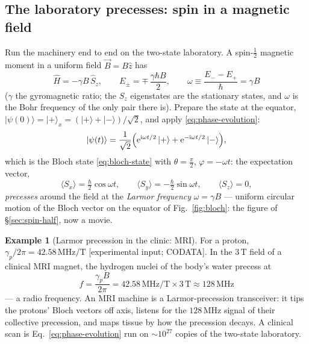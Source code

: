 \documentclass[11pt]{article}
\theoremstyle{plain}
\theoremstyle{definition}
\newtheorem{example}[theorem]{Example}
\theoremstyle{remark}
\newcommand{\ee}{\mathrm{e}}
\newcommand{\ii}{\mathrm{i}}
\newcommand{\op}[1]{\hat{#1}}
\newcommand{\ket}[1]{\lvert #1 \rangle}
\begin{document}
\subsection{The laboratory precesses: spin in a magnetic field}
\label{sec:precession}

Run the machinery end to end on the two-state laboratory. A
spin-$\tfrac12$ magnetic moment in a uniform field $\vec B = B\hat z$
has
\begin{equation}
  \op H = -\gamma B\,\op S_z,
  \qquad
  E_\pm = \mp\,\frac{\gamma\hbar B}{2},
  \qquad
  \omega \equiv \frac{E_- - E_+}{\hbar} = \gamma B
\end{equation}
($\gamma$ the gyromagnetic ratio; the $S_z$ eigenstates are the
stationary states, and $\omega$ is the Bohr frequency of the only
pair there is). Prepare the state at the equator,
$\ket{\psi(0)} = \ket+_x = (\ket+ + \ket-)/\sqrt2$, and apply
\eqref{eq:phase-evolution}:
\begin{equation}
  \ket{\psi(t)}
  = \frac{1}{\sqrt2}\Bigl(
      \ee^{\ii\omega t/2}\,\ket+
      + \ee^{-\ii\omega t/2}\,\ket-
    \Bigr),
\end{equation}
which is the Bloch state \eqref{eq:bloch-state} with
$\theta = \tfrac\pi2$, $\varphi = -\omega t$: the expectation
vector,
\begin{equation}
  \langle S_x\rangle = \tfrac\hbar2\cos\omega t,
  \qquad
  \langle S_y\rangle = -\tfrac\hbar2\sin\omega t,
  \qquad
  \langle S_z\rangle = 0,
\end{equation}
\emph{precesses} around the field at the \emph{Larmor frequency}
$\omega = \gamma B$ --- uniform circular motion of the Bloch vector
on the equator of Fig.~\ref{fig:bloch}: the figure of
\S\ref{sec:spin-half}, now a movie.

\begin{example}[Larmor precession in the clinic: MRI]
\label{ex:mri}
For a proton, $\gamma_p/2\pi = 42.58\,\mathrm{MHz/T}$
[experimental input; CODATA]. In the
$3\,\mathrm T$ field of a clinical MRI magnet, the hydrogen nuclei
of the body's water precess at
\begin{equation}
  f = \frac{\gamma_p B}{2\pi}
  = 42.58\,\mathrm{MHz/T} \times 3\,\mathrm T
  \approx 128\,\mathrm{MHz}
\end{equation}
--- a radio frequency. An MRI machine is a Larmor-precession
transceiver: it tips the protons' Bloch vectors off axis, listens
for the $128\,\mathrm{MHz}$ signal of their collective precession,
and maps tissue by how the precession decays. A clinical scan
is Eq.~\eqref{eq:phase-evolution} run on $\sim 10^{27}$ copies of
the two-state laboratory.
\end{example}
\end{document}
